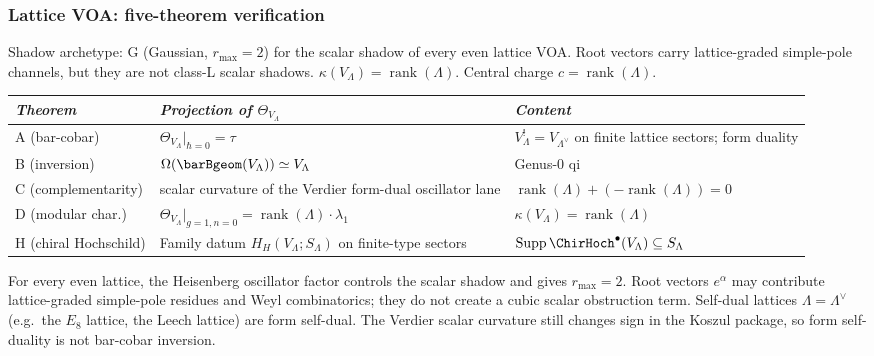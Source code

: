 \subsubsection{Lattice VOA: five-theorem verification}

\begin{computation}
\label{comp:lattice-five-theorems}
Shadow archetype: G (Gaussian, $r_{\max} = 2$) for the scalar
shadow of every even lattice VOA. Root vectors carry lattice-graded
simple-pole channels, but they are not class-L scalar shadows.
$\kappa(V_\Lambda) = \operatorname{rank}(\Lambda)$.
Central charge $c = \operatorname{rank}(\Lambda)$.
\begin{center}
\small
\renewcommand{\arraystretch}{1.3}
\begin{tabular}{lll}
\toprule
\emph{Theorem} & \emph{Projection of $\Theta_{V_\Lambda}$}
 & \emph{Content} \\
\midrule
A (bar-cobar) &
 $\Theta_{V_\Lambda}\big|_{\hbar=0} = \tau$ &
 $V_\Lambda^! = V_{\Lambda^\vee}$ on finite lattice sectors; form duality \\
B (inversion) &
 $\Omega(\barBgeom(V_\Lambda)) \simeq V_\Lambda$ &
 Genus-$0$ qi \\
C (complementarity) &
 scalar curvature of the Verdier form-dual oscillator lane &
 $\operatorname{rank}(\Lambda)+(-\operatorname{rank}(\Lambda))=0$ \\
D (modular char.) &
 $\Theta_{V_\Lambda}\big|_{g=1,n=0}
 = \operatorname{rank}(\Lambda) \cdot \lambda_1$ &
 $\kappa(V_\Lambda) = \operatorname{rank}(\Lambda)$ \\
H (chiral Hochschild) &
 Family datum $H_H(V_\Lambda;S_\Lambda)$ on finite-type sectors &
 $\operatorname{Supp}\ChirHoch^\bullet(V_\Lambda)\subseteq S_\Lambda$ \\
\bottomrule
\end{tabular}
\end{center}
For every even lattice, the Heisenberg oscillator factor controls the
scalar shadow and gives $r_{\max}=2$. Root vectors
$e^\alpha$ may contribute lattice-graded simple-pole residues and Weyl
combinatorics; they do not create a cubic scalar obstruction term.
Self-dual lattices $\Lambda=\Lambda^\vee$ (e.g.\ the $E_8$ lattice,
the Leech lattice) are form self-dual. The Verdier scalar curvature
still changes sign in the Koszul package, so form self-duality is not
bar-cobar inversion.
\end{computation}


